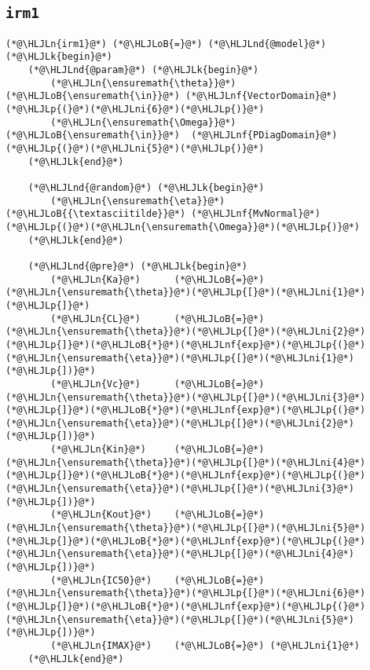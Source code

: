 \documentclass[12pt,a4paper]{article}
\newcommand{\HLJLk}[1]{\textcolor[RGB]{148,91,176}{\textbf{#1}}}
\newcommand{\HLJLn}[1]{#1}
\newcommand{\HLJLnd}[1]{\textcolor[RGB]{214,102,97}{#1}}
\newcommand{\HLJLnf}[1]{\textcolor[RGB]{66,102,213}{#1}}
\newcommand{\HLJLni}[1]{\textcolor[RGB]{59,151,46}{#1}}
\newcommand{\HLJLoB}[1]{\textcolor[RGB]{102,102,102}{\textbf{#1}}}
\newcommand{\HLJLp}[1]{#1}
\begin{document}
\subsection{\texttt{irm1}}

\begin{lstlisting}
(*@\HLJLn{irm1}@*) (*@\HLJLoB{=}@*) (*@\HLJLnd{@model}@*) (*@\HLJLk{begin}@*)
    (*@\HLJLnd{@param}@*) (*@\HLJLk{begin}@*)
        (*@\HLJLn{\ensuremath{\theta}}@*) (*@\HLJLoB{\ensuremath{\in}}@*) (*@\HLJLnf{VectorDomain}@*)(*@\HLJLp{(}@*)(*@\HLJLni{6}@*)(*@\HLJLp{)}@*)
        (*@\HLJLn{\ensuremath{\Omega}}@*) (*@\HLJLoB{\ensuremath{\in}}@*)  (*@\HLJLnf{PDiagDomain}@*)(*@\HLJLp{(}@*)(*@\HLJLni{5}@*)(*@\HLJLp{)}@*)
    (*@\HLJLk{end}@*)

    (*@\HLJLnd{@random}@*) (*@\HLJLk{begin}@*)
        (*@\HLJLn{\ensuremath{\eta}}@*) (*@\HLJLoB{{\textasciitilde}}@*) (*@\HLJLnf{MvNormal}@*)(*@\HLJLp{(}@*)(*@\HLJLn{\ensuremath{\Omega}}@*)(*@\HLJLp{)}@*)
    (*@\HLJLk{end}@*)

    (*@\HLJLnd{@pre}@*) (*@\HLJLk{begin}@*)
        (*@\HLJLn{Ka}@*)      (*@\HLJLoB{=}@*) (*@\HLJLn{\ensuremath{\theta}}@*)(*@\HLJLp{[}@*)(*@\HLJLni{1}@*)(*@\HLJLp{]}@*)
        (*@\HLJLn{CL}@*)      (*@\HLJLoB{=}@*) (*@\HLJLn{\ensuremath{\theta}}@*)(*@\HLJLp{[}@*)(*@\HLJLni{2}@*)(*@\HLJLp{]}@*)(*@\HLJLoB{*}@*)(*@\HLJLnf{exp}@*)(*@\HLJLp{(}@*)(*@\HLJLn{\ensuremath{\eta}}@*)(*@\HLJLp{[}@*)(*@\HLJLni{1}@*)(*@\HLJLp{])}@*)
        (*@\HLJLn{Vc}@*)      (*@\HLJLoB{=}@*) (*@\HLJLn{\ensuremath{\theta}}@*)(*@\HLJLp{[}@*)(*@\HLJLni{3}@*)(*@\HLJLp{]}@*)(*@\HLJLoB{*}@*)(*@\HLJLnf{exp}@*)(*@\HLJLp{(}@*)(*@\HLJLn{\ensuremath{\eta}}@*)(*@\HLJLp{[}@*)(*@\HLJLni{2}@*)(*@\HLJLp{])}@*)
        (*@\HLJLn{Kin}@*)     (*@\HLJLoB{=}@*) (*@\HLJLn{\ensuremath{\theta}}@*)(*@\HLJLp{[}@*)(*@\HLJLni{4}@*)(*@\HLJLp{]}@*)(*@\HLJLoB{*}@*)(*@\HLJLnf{exp}@*)(*@\HLJLp{(}@*)(*@\HLJLn{\ensuremath{\eta}}@*)(*@\HLJLp{[}@*)(*@\HLJLni{3}@*)(*@\HLJLp{])}@*)
        (*@\HLJLn{Kout}@*)    (*@\HLJLoB{=}@*) (*@\HLJLn{\ensuremath{\theta}}@*)(*@\HLJLp{[}@*)(*@\HLJLni{5}@*)(*@\HLJLp{]}@*)(*@\HLJLoB{*}@*)(*@\HLJLnf{exp}@*)(*@\HLJLp{(}@*)(*@\HLJLn{\ensuremath{\eta}}@*)(*@\HLJLp{[}@*)(*@\HLJLni{4}@*)(*@\HLJLp{])}@*)
        (*@\HLJLn{IC50}@*)    (*@\HLJLoB{=}@*) (*@\HLJLn{\ensuremath{\theta}}@*)(*@\HLJLp{[}@*)(*@\HLJLni{6}@*)(*@\HLJLp{]}@*)(*@\HLJLoB{*}@*)(*@\HLJLnf{exp}@*)(*@\HLJLp{(}@*)(*@\HLJLn{\ensuremath{\eta}}@*)(*@\HLJLp{[}@*)(*@\HLJLni{5}@*)(*@\HLJLp{])}@*)
        (*@\HLJLn{IMAX}@*)    (*@\HLJLoB{=}@*) (*@\HLJLni{1}@*)
    (*@\HLJLk{end}@*)


\end{lstlisting}
\end{document}
